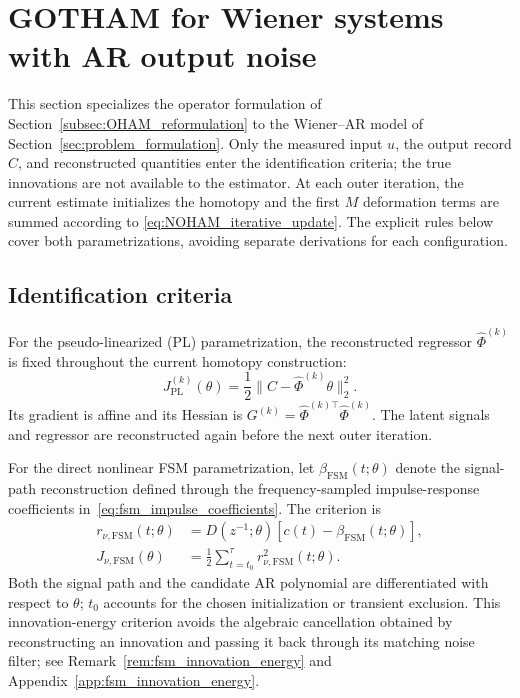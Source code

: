 \section{GOTHAM for Wiener systems with AR output noise}
\label{sec:GOTHAM_for_WS_AR_noise}

This section specializes the operator formulation of
Section~\ref{subsec:OHAM_reformulation} to the Wiener--AR model of
Section~\ref{sec:problem_formulation}. Only the measured input $u$, the output
record $C$, and reconstructed quantities enter the identification criteria;
the true innovations are not available to the estimator. At each outer
iteration, the current estimate initializes the homotopy and the first $M$
deformation terms are summed according to
\eqref{eq:NOHAM_iterative_update}. The explicit rules below cover both
parametrizations, avoiding separate derivations for each configuration.

\subsection{Identification criteria}
\label{subsec:GOTHAM_PL_parametrization}
\label{subsec:GOTHAM_FSM_parametrization}

For the pseudo-linearized (PL) parametrization, the reconstructed regressor
$\hat\Phi^{(k)}$ is fixed throughout the current homotopy construction:
\begin{equation}
\label{eq:WS_loss_k}
    J_{\mathrm{PL}}^{(k)}(\theta)
    =\frac12\|C-\hat\Phi^{(k)}\theta\|_2^2.
\end{equation}
Its gradient is affine and its Hessian is
$G^{(k)}=\hat\Phi^{(k)\top}\hat\Phi^{(k)}$. The latent signals and regressor
are reconstructed again before the next outer iteration.

For the direct nonlinear FSM parametrization, let
$\beta_{\mathrm{FSM}}(t;\theta)$ denote the signal-path reconstruction
defined through the frequency-sampled impulse-response coefficients
in~\eqref{eq:fsm_impulse_coefficients}. The criterion is
\begin{align}
\label{eq:FSM_innovation_residual_filter}
    r_{\nu,\mathrm{FSM}}(t;\theta)
    &=D(z^{-1};\theta)[c(t)-\beta_{\mathrm{FSM}}(t;\theta)],\\
\label{eq:FSM_innovation_energy_loss}
    J_{\nu,\mathrm{FSM}}(\theta)
    &=\frac12\sum_{t=t_0}^{\tau}r_{\nu,\mathrm{FSM}}^2(t;\theta).
\end{align}
Both the signal path and the candidate AR polynomial are differentiated
with respect to $\theta$; $t_0$ accounts for the chosen initialization or
transient exclusion. This innovation-energy criterion avoids the algebraic
cancellation obtained by reconstructing an innovation and passing it back
through its matching noise filter; see
Remark~\ref{rem:fsm_innovation_energy} and
Appendix~\ref{app:fsm_innovation_energy}.

